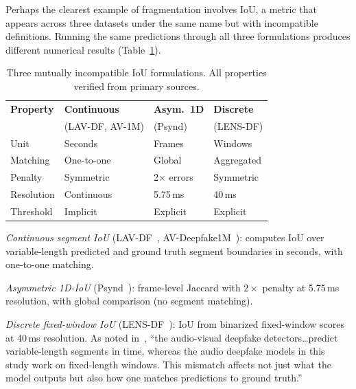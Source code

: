 \documentclass[journal]{IEEEtran}
\begin{document}
Perhaps the clearest example of fragmentation involves IoU, a metric that appears across three datasets under the same name but with incompatible definitions. Running the same predictions through all three formulations produces different numerical results (Table~\ref{tab:iou_compare}).

\begin{table}[t]
\centering
\caption{Three mutually incompatible IoU formulations. All properties verified from primary sources.}
\label{tab:iou_compare}
\small
\begin{tabular}{p{1.7cm}p{1.8cm}p{1.8cm}p{1.8cm}}
\toprule
\textbf{Property} & \textbf{Continuous} & \textbf{Asym.\ 1D} & \textbf{Discrete} \\
 & (LAV-DF, AV-1M) & (Psynd) & (LENS-DF) \\
\midrule
Unit & Seconds & Frames & Windows \\
Matching & One-to-one & Global & Aggregated \\
Penalty & Symmetric & 2$\times$ errors & Symmetric \\
Resolution & Continuous & 5.75\,ms & 40\,ms \\
Threshold & Implicit & Explicit & Explicit \\
\bottomrule
\end{tabular}
\end{table}

\emph{Continuous segment IoU} (LAV-DF~\cite{cai2022lavdf}, AV-Deepfake1M~\cite{cai2024avdeepfake1m}): computes IoU over variable-length predicted and ground truth segment boundaries in seconds, with one-to-one matching.

\emph{Asymmetric 1D-IoU} (Psynd~\cite{zhang2022localizing}): frame-level Jaccard with $2\times$ penalty at 5.75\,ms resolution, with global comparison (no segment matching).

\emph{Discrete fixed-window IoU} (LENS-DF~\cite{liu2025lensdf}): IoU from binarized fixed-window scores at 40\,ms resolution. As noted in~\cite{liu2025lensdf}, ``the audio-visual deepfake detectors\ldots predict variable-length segments in time, whereas the audio deepfake models in this study work on fixed-length windows. This mismatch affects not just what the model outputs but also how one matches predictions to ground truth.''






\end{document}
